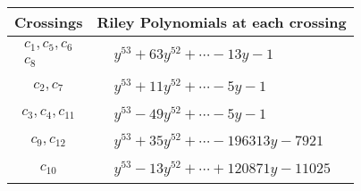 \documentclass[1p]{elsarticle_modified}
\theoremstyle{definition}
\begin{document}
\begin{tabular}{m{50pt}|m{274pt}}
Crossings & \hspace{64pt}Riley Polynomials at each crossing \\
\hline $$\begin{aligned}c_{1},c_{5},c_{6}\\c_{8}\end{aligned}$$&$\begin{aligned}
&y^{53}+63 y^{52}+\cdots-13 y-1
\end{aligned}$\\
\hline $$\begin{aligned}c_{2},c_{7}\end{aligned}$$&$\begin{aligned}
&y^{53}+11 y^{52}+\cdots-5 y-1
\end{aligned}$\\
\hline $$\begin{aligned}c_{3},c_{4},c_{11}\end{aligned}$$&$\begin{aligned}
&y^{53}-49 y^{52}+\cdots-5 y-1
\end{aligned}$\\
\hline $$\begin{aligned}c_{9},c_{12}\end{aligned}$$&$\begin{aligned}
&y^{53}+35 y^{52}+\cdots-196313 y-7921
\end{aligned}$\\
\hline $$\begin{aligned}c_{10}\end{aligned}$$&$\begin{aligned}
&y^{53}-13 y^{52}+\cdots+120871 y-11025
\end{aligned}$\\
\hline
\end{tabular}
\vskip 2pc
\end{document}
